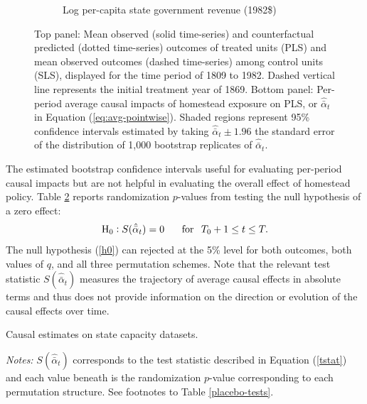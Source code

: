 \documentclass[12pt]{article}
\begin{document}
\begin{figure}[htbp]
\begin{subfigure}[t]{0.75\textwidth}
		\caption{Log per-capita state government revenue (1982\$)\label{mc-estimates-rev-pc}}
	\end{subfigure}
	\caption{Top panel: Mean observed (solid time-series) and counterfactual predicted (dotted time-series) outcomes of treated units (PLS) and mean observed outcomes (dashed time-series) among control units (SLS), displayed for the time period of 1809 to 1982. Dashed vertical line represents the initial treatment year of 1869. Bottom panel: Per-period average causal impacts of homestead exposure on PLS, or $\hat{\bar{\alpha}}_{t}$ in Equation (\ref{eq:avg-pointwise}). Shaded regions represent 95\% confidence intervals estimated by taking $\hat{\bar{\alpha}}_{t} \pm 1.96$ the standard error of the distribution of 1,000 bootstrap replicates of $\hat{\bar{\alpha}}_{t}$.\label{mc-estimates}} 
\end{figure}

The estimated bootstrap confidence intervals useful for evaluating per-period causal impacts but are not helpful in evaluating the overall effect of homestead policy. Table \ref{mc-estimates} reports randomization $p$-values from testing the null hypothesis of a zero effect:
%
\begin{equation} \label{h0}
\text{H}_0: S (\hat{\bar{\alpha}}_{t}) = 0  \, \hspace{5mm} \,  \text{for} \, \hspace{2mm} T_0 + 1 \leq t \leq T.
\end{equation}
%
The null hypothesis (\ref{h0}) can rejected at the 5\% level for both outcomes, both values of $q$, and all three permutation schemes. Note that the relevant test statistic $S (\hat{\bar{\alpha}}_{t})$ measures the trajectory of average causal effects in absolute terms and thus does not provide information on the direction or evolution of the causal effects over time. %

\begin{table}[htbp]
	\captionsetup{font=normalsize}
	\caption{Causal estimates on state capacity datasets.\label{mc-estimates}}
	\begin{center}
		
	\end{center}
	\footnotesize{\emph{Notes:} $S (\hat{\bar{\alpha}}_{t})$ corresponds to the test statistic described in Equation (\ref{tstat}) and each value beneath is the randomization $p$-value corresponding to each permutation structure. See footnotes to Table \ref{placebo-tests}.}
\end{table}
\end{document}
